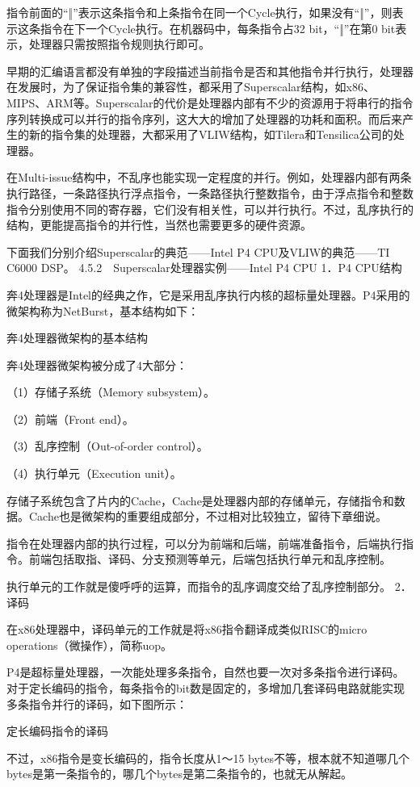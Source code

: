 \documentclass[12pt,UTF8]{ctexbook}
\begin{document}
指令前面的“‖”表示这条指令和上条指令在同一个Cycle执行，如果没有“‖”，则表示这条指令在下一个Cycle执行。在机器码中，每条指令占32 bit，“‖”在第0 bit表示，处理器只需按照指令规则执行即可。

早期的汇编语言都没有单独的字段描述当前指令是否和其他指令并行执行，处理器在发展时，为了保证指令集的兼容性，都采用了Superscalar结构，如x86、MIPS、ARM等。Superscalar的代价是处理器内部有不少的资源用于将串行的指令序列转换成可以并行的指令序列，这大大的增加了处理器的功耗和面积。而后来产生的新的指令集的处理器，大都采用了VLIW结构，如Tilera和Tensilica公司的处理器。

在Multi-issue结构中，不乱序也能实现一定程度的并行。例如，处理器内部有两条执行路径，一条路径执行浮点指令，一条路径执行整数指令，由于浮点指令和整数指令分别使用不同的寄存器，它们没有相关性，可以并行执行。不过，乱序执行的结构，更能提高指令的并行性，当然也需要更多的硬件资源。

下面我们分别介绍Superscalar的典范——Intel P4 CPU及VLIW的典范——TI C6000 DSP。
4.5.2　Superscalar处理器实例——Intel P4 CPU
1．P4 CPU结构

奔4处理器是Intel的经典之作，它是采用乱序执行内核的超标量处理器。P4采用的微架构称为NetBurst，基本结构如下：

奔4处理器微架构的基本结构

奔4处理器微架构被分成了4大部分：

（1）存储子系统（Memory subsystem）。

（2）前端（Front end）。

（3）乱序控制（Out-of-order control）。

（4）执行单元（Execution unit）。

存储子系统包含了片内的Cache，Cache是处理器内部的存储单元，存储指令和数据。Cache也是微架构的重要组成部分，不过相对比较独立，留待下章细说。

指令在处理器内部的执行过程，可以分为前端和后端，前端准备指令，后端执行指令。前端包括取指、译码、分支预测等单元，后端包括执行单元和乱序控制。

执行单元的工作就是傻呼呼的运算，而指令的乱序调度交给了乱序控制部分。
2．译码

在x86处理器中，译码单元的工作就是将x86指令翻译成类似RISC的micro operations（微操作），简称uop。

P4是超标量处理器，一次能处理多条指令，自然也要一次对多条指令进行译码。对于定长编码的指令，每条指令的bit数是固定的，多增加几套译码电路就能实现多条指令并行的译码，如下图所示：

定长编码指令的译码

不过，x86指令是变长编码的，指令长度从1～15 bytes不等，根本就不知道哪几个bytes是第一条指令的，哪几个bytes是第二条指令的，也就无从解起。
\end{document}
